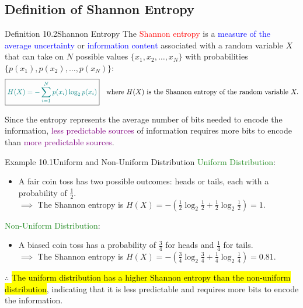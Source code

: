 \documentclass{book}
\begin{document}
\subsection{Definition of Shannon Entropy}
\begin{defBox}{Definition 10.2}{Shannon Entropy}
    The \textcolor{red}{Shannon entropy} is a \textcolor{blue}{measure of the average uncertainty} or \textcolor{blue}{information content} associated with a random variable $X$ that can take on $N$ possible values $\{x_1, x_2, \ldots, x_N\}$ with probabilities $\{p(x_1), p(x_2), \ldots, p(x_N)\}$:
    \[
        \boxed{\textcolor{teal}{H(X) = -\sum_{i=1}^{N} p(x_i) \log_2 p(x_i)}} \quad \text{where } H(X) \text{ is the Shannon entropy of the random variable } X.
    \]
\end{defBox}
Since the entropy represents the average number of bits needed to encode the information, \textcolor{purple}{less predictable sources} of information requires more bits to encode than \textcolor{purple}{more predictable sources}.
\begin{egBox}{Example 10.1}{Uniform and Non-Uniform Distribution}
    \textcolor{forestgreen}{Uniform Distribution}:
    \begin{itemize}
        \item A fair coin toss has two possible outcomes: heads or tails, each with a probability of $\frac{1}{2}$. \\
        $\implies$ The Shannon entropy is $H(X) = -\left(\frac{1}{2} \log_2 \frac{1}{2} + \frac{1}{2} \log_2 \frac{1}{2}\right) = 1$.
    \end{itemize}
    \textcolor{forestgreen}{Non-Uniform Distribution}:
    \begin{itemize}
        \item A biased coin toss has a probability of $\frac{3}{4}$ for heads and $\frac{1}{4}$ for tails. \\
        $\implies$ The Shannon entropy is $H(X) = -\left(\frac{3}{4} \log_2 \frac{3}{4} + \frac{1}{4} \log_2 \frac{1}{4}\right) = 0.81$.
    \end{itemize}
    $\therefore$ \hl{The uniform distribution has a higher Shannon entropy than the non-uniform distribution}, indicating that it is less predictable and requires more bits to encode the information.
\end{egBox}
\newpage
\end{document}
